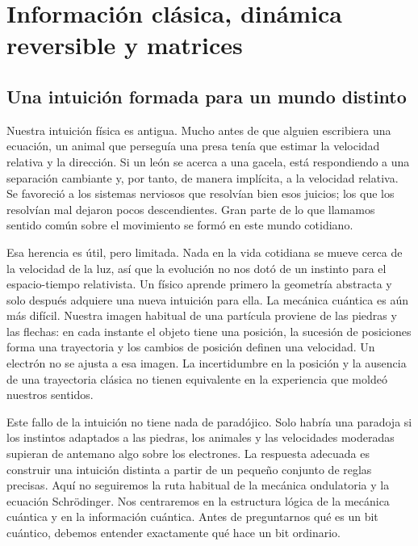 \chapter{Información clásica, dinámica reversible y matrices}


\section{Una intuición formada para un mundo distinto}

Nuestra intuición física es antigua. Mucho antes de que alguien escribiera una ecuación, un animal que perseguía una presa tenía que estimar la velocidad relativa y la dirección. Si un león se acerca a una gacela, está respondiendo a una separación cambiante y, por tanto, de manera implícita, a la velocidad relativa. Se favoreció a los sistemas nerviosos que resolvían bien esos juicios; los que los resolvían mal dejaron pocos descendientes. Gran parte de lo que llamamos sentido común sobre el movimiento se formó en este mundo cotidiano.

Esa herencia es útil, pero limitada. Nada en la vida cotidiana se mueve cerca de la velocidad de la luz, así que la evolución no nos dotó de un instinto para el espacio-tiempo relativista. Un físico aprende primero la geometría abstracta y solo después adquiere una nueva intuición para ella. La mecánica cuántica es aún más difícil. Nuestra imagen habitual de una partícula proviene de las piedras y las flechas: en cada instante el objeto tiene una posición, la sucesión de posiciones forma una trayectoria y los cambios de posición definen una velocidad. Un electrón no se ajusta a esa imagen. La incertidumbre en la posición y la ausencia de una trayectoria clásica no tienen equivalente en la experiencia que moldeó nuestros sentidos.

Este fallo de la intuición no tiene nada de paradójico. Solo habría una paradoja si los instintos adaptados a las piedras, los animales y las velocidades moderadas supieran de antemano algo sobre los electrones. La respuesta adecuada es construir una intuición distinta a partir de un pequeño conjunto de reglas precisas. Aquí no seguiremos la ruta habitual de la mecánica ondulatoria y la ecuación Schr\"odinger. Nos centraremos en la estructura lógica de la mecánica cuántica y en la información cuántica. Antes de preguntarnos qué es un bit cuántico, debemos entender exactamente qué hace un bit ordinario.

